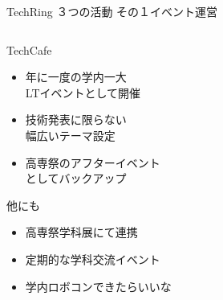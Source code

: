 \documentclass[dvipdfmx]{beamer}
\begin{document}
\begin{frame}{TechRing ３つの活動 その１}{イベント運営}
  \begin{columns}[totalwidth=\textwidth]
    \begin{column}{0.55\textwidth}
      \begin{alertblock}{TechCafe}
        \begin{itemize}
          \item 年に一度の学内一大\\LTイベントとして開催
          \item 技術発表に限らない\\幅広いテーマ設定
          \item 高専祭のアフターイベント\\としてバックアップ
        \end{itemize}
      \end{alertblock}

      \begin{block}{他にも}
        \begin{footnotesize}
          \begin{itemize}
            \item 高専祭学科展にて連携
            \item 定期的な学科交流イベント
            \item 学内ロボコンできたらいいな
          \end{itemize}
        \end{footnotesize}
      \end{block}
    \end{column}


\end{columns}
\end{frame}
\end{document}
